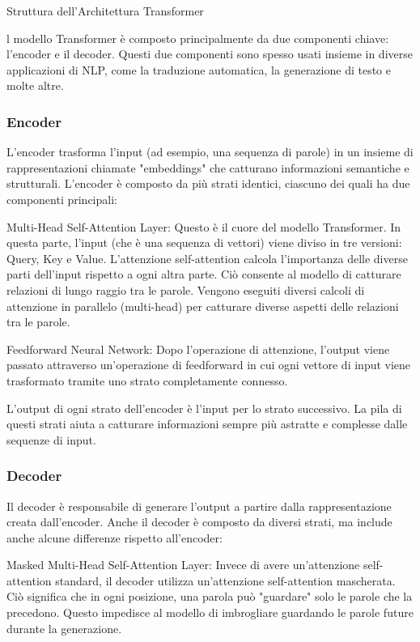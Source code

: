 Struttura dell'Architettura Transformer

l modello Transformer è composto principalmente da due componenti chiave: l'encoder e il decoder. Questi due componenti sono spesso usati insieme in diverse applicazioni di NLP, come la traduzione automatica, la generazione di testo e molte altre.

\subsubsection{Encoder}
L'encoder trasforma l'input (ad esempio, una sequenza di parole) in un insieme di rappresentazioni chiamate "embeddings" che catturano informazioni semantiche e strutturali. L'encoder è composto da più strati identici, ciascuno dei quali ha due componenti principali:

Multi-Head Self-Attention Layer: Questo è il cuore del modello Transformer. In questa parte, l'input (che è una sequenza di vettori) viene diviso in tre versioni: Query, Key e Value. L'attenzione self-attention calcola l'importanza delle diverse parti dell'input rispetto a ogni altra parte. Ciò consente al modello di catturare relazioni di lungo raggio tra le parole. Vengono eseguiti diversi calcoli di attenzione in parallelo (multi-head) per catturare diverse aspetti delle relazioni tra le parole.

Feedforward Neural Network: Dopo l'operazione di attenzione, l'output viene passato attraverso un'operazione di feedforward in cui ogni vettore di input viene trasformato tramite uno strato completamente connesso.

L'output di ogni strato dell'encoder è l'input per lo strato successivo. La pila di questi strati aiuta a catturare informazioni sempre più astratte e complesse dalle sequenze di input.

\subsubsection{Decoder}
Il decoder è responsabile di generare l'output a partire dalla rappresentazione creata dall'encoder. Anche il decoder è composto da diversi strati, ma include anche alcune differenze rispetto all'encoder:

Masked Multi-Head Self-Attention Layer: Invece di avere un'attenzione self-attention standard, il decoder utilizza un'attenzione self-attention mascherata. Ciò significa che in ogni posizione, una parola può "guardare" solo le parole che la precedono. Questo impedisce al modello di imbrogliare guardando le parole future durante la generazione.

